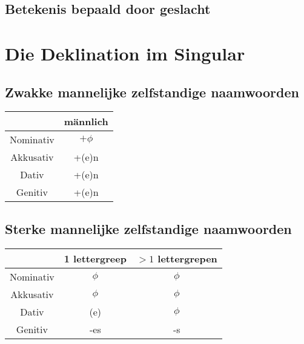 \documentclass[main.tex]{subfiles}
\begin{document}
\subsection{Betekenis bepaald door geslacht}

\section{Die Deklination im Singular}
\subsection{Zwakke mannelijke zelfstandige naamwoorden}

\begin{tabular}{|c|c|}
\hline 
\rowcolor{gray}
 & männlich \\ 
\hline 
\cellcolor[gray]{0.8}Nominativ & $+\phi$ \\ 
\hline 
\cellcolor[gray]{0.8}Akkusativ & +(e)n \\ 
\hline 
\cellcolor[gray]{0.8}Dativ & +(e)n\\ 
\hline 
\cellcolor[gray]{0.8}Genitiv & +(e)n \\ 
\hline 
\end{tabular} 

\subsection{Sterke mannelijke zelfstandige naamwoorden}
\begin{tabular}{|c|c|c|}
\hline 
\rowcolor{gray}
& 1 lettergreep & $>1$ lettergrepen \\ 
\hline 
\cellcolor[gray]{0.8}Nominativ & $\phi$ & $\phi$\\ 
\hline 
\cellcolor[gray]{0.8}Akkusativ & $\phi$ & $\phi$\\ 
\hline 
\cellcolor[gray]{0.8}Dativ & (e) & $\phi$ \\ 
\hline 
\cellcolor[gray]{0.8}Genitiv & -es & -s \\ 
\hline 
\end{tabular} 
\end{document}
